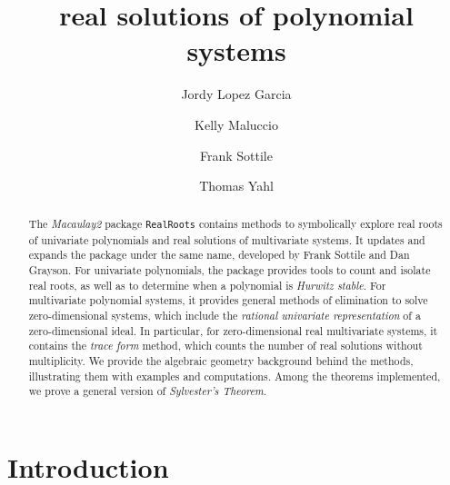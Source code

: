\documentclass[12pt]{amsart}
\title{real solutions of polynomial systems}
\author[J.~Lopez Garcia]{Jordy Lopez Garcia}
\author[K.~Maluccio]{Kelly Maluccio}
\author[F.~Sottile]{Frank Sottile}
\author[T.~Yahl]{Thomas Yahl}
\theoremstyle{definition}
\begin{document}
%
%

\begin{abstract}

The \textit{Macaulay2} package \texttt{RealRoots} contains methods to symbolically explore real roots of univariate polynomials and real solutions of multivariate systems. It updates and expands the package under the same name, developed by Frank Sottile and Dan Grayson. For univariate polynomials, the package provides tools to count and isolate real roots, as well as to determine when a polynomial is \textit{Hurwitz stable}. For multivariate polynomial systems, it provides general methods of elimination to solve zero-dimensional systems, which include the \textit{rational univariate representation} of a zero-dimensional ideal. In particular, for zero-dimensional real multivariate systems, it contains the \textit{trace form} method, which counts the number of real solutions without multiplicity. We provide the algebraic geometry background behind the methods, illustrating them with examples and computations. Among the theorems implemented, we prove a general version of \textit{Sylvester's Theorem}.

\end{abstract}

\maketitle


\section*{Introduction}

\end{document}
